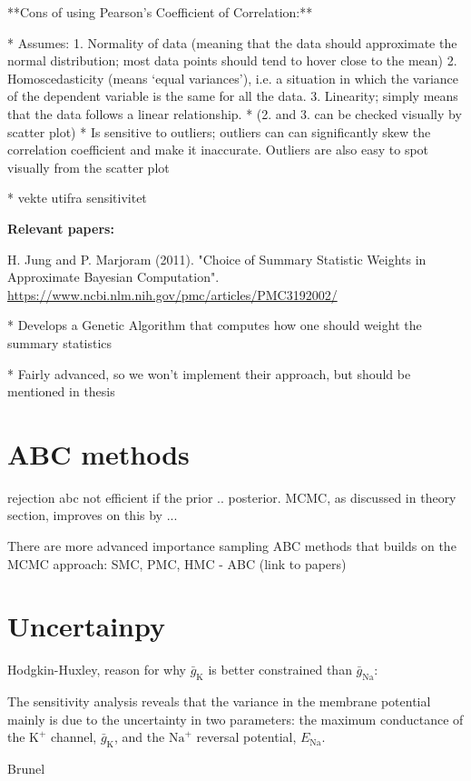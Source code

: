 **Cons of using Pearson's Coefficient of Correlation:**

* Assumes:
    1. Normality of data (meaning that the data should approximate the normal distribution; most data points should tend to hover close to the mean)
    2. Homoscedasticity (means ‘equal variances’), i.e. a situation in which the variance of the dependent variable is the same for all the data.
    3. Linearity; simply means that the data follows a linear relationship. 
* (2. and 3. can be checked visually by scatter plot)
* Is sensitive to outliers; outliers can can significantly skew the correlation coefficient and make it inaccurate. Outliers are also easy to spot visually from the scatter plot

* vekte utifra sensitivitet

\textbf{Relevant papers:}

H. Jung and P. Marjoram (2011). "Choice of Summary Statistic Weights in Approximate Bayesian Computation". \url{https://www.ncbi.nlm.nih.gov/pmc/articles/PMC3192002/}

* Develops a Genetic Algorithm that computes how one should weight the summary statistics 

* Fairly advanced, so we won't implement their approach, but should be mentioned in thesis

\section{ABC methods}

rejection abc not efficient if the prior .. posterior. MCMC, as discussed in theory section, improves on this by ... 

There are more advanced importance sampling ABC methods that builds on the MCMC approach: SMC, PMC, HMC - ABC (link to papers)


\section{Uncertainpy}

Hodgkin-Huxley, reason for why $\bar{g}_\mathrm{K}$ is better constrained than $\bar{g}_\mathrm{Na}$:

The sensitivity analysis reveals that the variance in the membrane potential mainly is due to the uncertainty in two parameters: the maximum conductance of the $\mathrm{K}^+$ channel, $\bar{g}_\mathrm{K}$, and the $\mathrm{Na}^+$ reversal potential, $E_\mathrm{Na}$.

Brunel 

